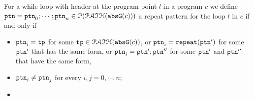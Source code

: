 \begin{enumerate}
\begin{defn}
  \label{def:repeat-pattern}
  For a while loop with header at the program point $l$ in a program $c$
  we define
  $\mathtt{ptn} = \mathtt{ptn}_0; \cdots; \mathtt{ptn}_n \in \mathcal{P}(\mathcal{PATH}({\mathtt{abs}{\mathtt{G}}(c)}))$
  a repeat pattern for the 
  loop $l$ in $c$
if and only if
  \begin{itemize}
  \item $\mathtt{ptn}_i = \mathtt{tp}$ for some $\mathtt{tp} \in \mathcal{PATH}({\mathtt{abs}{\mathtt{G}}(c)})$, or $\mathtt{ptn}_i = \mathtt{repeat}(\mathtt{ptn}')$ for some
  $\mathtt{ptn}'$ that has the same form, or
  $\mathtt{ptn}_i = \mathtt{ptn}';\mathtt{ptn}''$ for some $\mathtt{ptn}'$ and $\mathtt{ptn}''$ that have the same form,
  \item $\mathtt{ptn}_i \neq \mathtt{ptn}_j$ for every $i, j = 0, \cdots, n$;
  \item 

\end{itemize}
\end{defn}
\end{enumerate}
